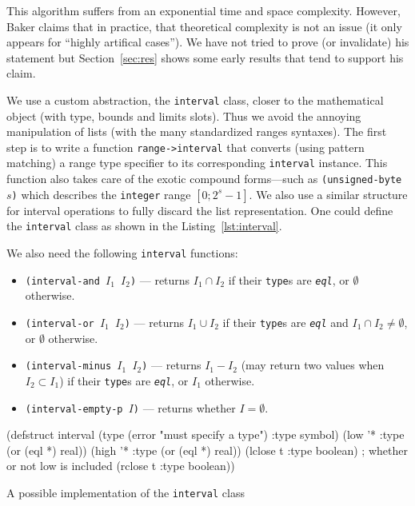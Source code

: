 \documentclass[format=sigconf]{acmart}
\newcommand\code[2][\small]{\sloppy\texttt{#1#2}}
\theoremstyle{definition}
\begin{document}
This algorithm suffers from an exponential time and space complexity. However,
Baker claims that in practice, that theoretical complexity is not an issue (it
only appears for ``highly artifical cases''). We have not tried to prove (or
invalidate) his statement but Section~\ref{sec:res} shows some early results
that tend to support his claim.

We use a custom abstraction, the \code{interval} class, closer to the
mathematical object (with type, bounds and limits slots). Thus we avoid the
annoying manipulation of lists (with the many standardized ranges syntaxes).
The first step is to write a function \code{range->interval} that converts
(using pattern matching) a range type specifier to its corresponding
\code{interval} instance. This function also takes care of the exotic compound
forms---such as \code{(unsigned-byte $s$)} which describes the \code{integer}
range $\left[0; 2^s-1\right]$. We also use a similar structure for interval
operations to fully discard the list representation. One could define the
\code{interval} class as shown in the Listing~\ref{lst:interval}.

We also need the following \code{interval} functions:
\begin{itemize}
\item \code{(interval-and $I_1$ $I_2$)} --- returns $I_1 \cap I_2$ if their
  \code{type}s are \emph{\code{eql}}, or $\emptyset$ otherwise.
\item \code{(interval-or $I_1$ $I_2$)} --- returns $I_1 \cup I_2$ if their
  \code{type}s are \emph{\code{eql}} and $I_1 \cap I_2 \not= \emptyset$, or $\emptyset$ otherwise.
\item \code{(interval-minus $I_1$ $I_2$)} --- returns $I_1 - I_2$ (may return
  two values when $I_2 \subset I_1$) if their \code{type}s are \emph{\code{eql}},
  or $I_1$ otherwise.
\item \code{(interval-empty-p $I$)} --- returns whether $I = \emptyset$.
\end{itemize}

\begin{listing}
\begin{clcode}
(defstruct interval
  (type (error "must specify a type") :type symbol)
  (low '* :type (or (eql *) real))
  (high '* :type (or (eql *) real))
  (lclose t :type boolean) ; whether or not low is included
  (rclose t :type boolean))
\end{clcode}
\caption{A possible implementation of the \code{interval} class}
\label{lst:interval}
\end{listing}
\end{document}
